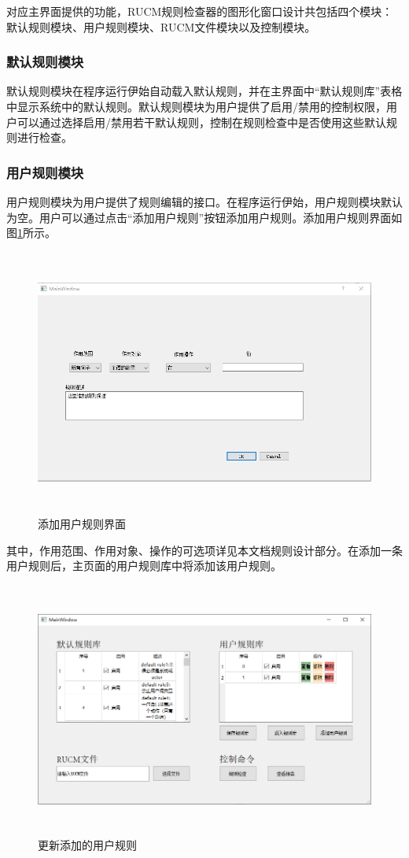 	对应主界面提供的功能，RUCM规则检查器的图形化窗口设计共包括四个模块：默认规则模块、用户规则模块、RUCM文件模块以及控制模块。
	
	\subsubsection{默认规则模块}
		默认规则模块在程序运行伊始自动载入默认规则，并在主界面中``默认规则库''表格中显示系统中的默认规则。默认规则模块为用户提供了启用/禁用的控制权限，用户可以通过选择启用/禁用若干默认规则，控制在规则检查中是否使用这些默认规则进行检查。
	\subsubsection{用户规则模块}
		用户规则模块为用户提供了规则编辑的接口。在程序运行伊始，用户规则模块默认为空。用户可以通过点击``添加用户规则''按钮添加用户规则。添加用户规则界面如图\ref{fig-gui-2}所示。
		\begin{figure}[htbp]
			\centering
			\includegraphics[width=5.77222in,height=3.45347in]{src/gui-2.png}
			\caption{添加用户规则界面}
			\label{fig-gui-2}
		\end{figure}
		其中，作用范围、作用对象、操作的可选项详见本文档规则设计部分。在添加一条用户规则后，主页面的用户规则库中将添加该用户规则。
		\begin{figure}[htbp]
			\centering
			\includegraphics[width=5.77222in,height=3.29583in]{src/gui-3.png}
			\caption{更新添加的用户规则}
			\label{fig-gui-3}
		\end{figure}
